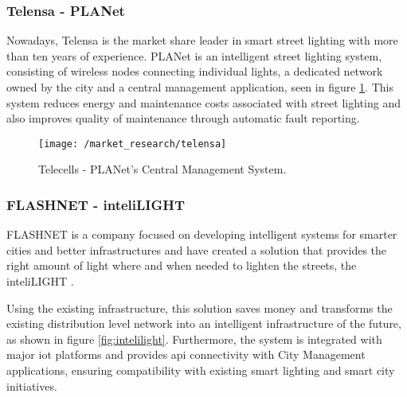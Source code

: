 
\subsubsection{Telensa - PLANet}

Nowadays, Telensa is the market share leader in smart street lighting with more than ten years of experience.\cite{telensa} PLANet is an intelligent street lighting system, consisting of wireless nodes connecting individual lights, a dedicated network owned by the city and a central management application, seen in figure \ref{fig:telensa}. This system reduces energy and maintenance costs associated with street lighting and also improves quality of maintenance through automatic fault reporting.
%
%

\begin{figure}[ht]
	\centering
	\texttt{[image: /market\_research/telensa]}
	\caption{Telecells - PLANet's Central Management System.}
	\label{fig:telensa}
\end{figure}

\subsubsection{FLASHNET - inteliLIGHT}
FLASHNET is a company focused on developing intelligent systems for smarter cities and better infrastructures and have created a solution that provides the right amount of light where and when needed to lighten the streets, the inteliLIGHT \cite{inteli_light}.

Using the existing infrastructure, this solution saves money and transforms the existing distribution level network into an intelligent infrastructure of the future, as shown in figure \ref{fig:intelilight}. Furthermore, the system is integrated with major \ac{iot} platforms and provides \ac{api} connectivity with City Management applications, ensuring compatibility with existing smart lighting and smart city initiatives.


